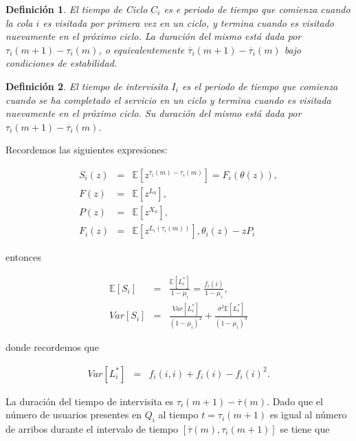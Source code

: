 \documentclass{article}
\newtheorem{Def}{Definición}
\newcommand{\esp}{\mathbb{E}}
\begin{document}
\begin{Def}
El tiempo de Ciclo $C_{i}$ es e periodo de tiempo que comienza cuando la cola $i$ es visitada por primera vez en un ciclo, y termina cuando es visitado nuevamente en el pr\'oximo ciclo. La duraci\'on del mismo est\'a dada por $\tau_{i}\left(m+1\right)-\tau_{i}\left(m\right)$, o equivalentemente $\overline{\tau}_{i}\left(m+1\right)-\overline{\tau}_{i}\left(m\right)$ bajo condiciones de estabilidad.
\end{Def}

\begin{Def}
El tiempo de intervisita $I_{i}$ es el periodo de tiempo que comienza cuando se ha completado el servicio en un ciclo y termina cuando es visitada nuevamente en el pr\'oximo ciclo. Su  duraci\'on del mismo est\'a dada por $\tau_{i}\left(m+1\right)-\overline{\tau}_{i}\left(m\right)$.
\end{Def}


Recordemos las siguientes expresiones:

\begin{eqnarray*}
S_{i}\left(z\right)&=&\esp\left[z^{\overline{\tau}_{i}\left(m\right)-\tau_{i}\left(m\right)}\right]=F_{i}\left(\theta\left(z\right)\right),\\
F\left(z\right)&=&\esp\left[z^{L_{0}}\right],\\
P\left(z\right)&=&\esp\left[z^{X_{n}}\right],\\
F_{i}\left(z\right)&=&\esp\left[z^{L_{i}\left(\tau_{i}\left(m\right)\right)}\right],
\theta_{i}\left(z\right)-zP_{i}
\end{eqnarray*}

entonces 

\begin{eqnarray*}
\esp\left[S_{i}\right]&=&\frac{\esp\left[L_{i}^{*}\right]}{1-\mu_{i}}=\frac{f_{i}\left(i\right)}{1-\mu_{i}},\\
Var\left[S_{i}\right]&=&\frac{Var\left[L_{i}^{*}\right]}{\left(1-\mu_{i}\right)^{2}}+\frac{\sigma^{2}\esp\left[L_{i}^{*}\right]}{\left(1-\mu_{i}\right)^{3}}
\end{eqnarray*}

donde recordemos que

\begin{eqnarray*}
Var\left[L_{i}^{*}\right]&=&f_{i}\left(i,i\right)+f_{i}\left(i\right)-f_{i}\left(i\right)^{2}.
\end{eqnarray*}

La duraci\'on del tiempo de intervisita es $\tau_{i}\left(m+1\right)-\overline{\tau}\left(m\right)$. Dado que el n\'umero de usuarios presentes en $Q_{i}$ al tiempo $t=\tau_{i}\left(m+1\right)$ es igual al n\'umero de arribos durante el intervalo de tiempo $\left[\overline{\tau}\left(m\right),\tau_{i}\left(m+1\right)\right]$ se tiene que
\end{document}
